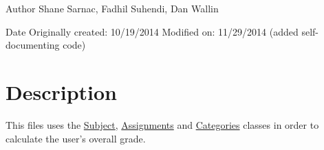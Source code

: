 \begin{DoxyAuthor}{Author}
Shane Sarnac, Fadhil Suhendi, Dan Wallin 

 
\end{DoxyAuthor}
\begin{DoxyDate}{Date}
Originally created\-: 10/19/2014  Modified on\-: 11/29/2014 (added self-\/documenting code)
\end{DoxyDate}


\hypertarget{index_desc}{}\section{Description}\label{index_desc}
This files uses the \hyperlink{class_subject}{Subject}, \hyperlink{class_assignments}{Assignments} and \hyperlink{class_categories}{Categories} classes in order to calculate the user's overall grade. 